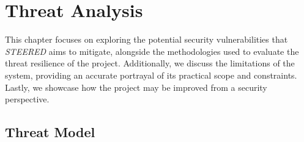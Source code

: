 \chapter{Threat Analysis}
\label{cha:ta}

This chapter focuses on exploring the potential security vulnerabilities that
\textit{STEERED} aims to mitigate, alongside the methodologies used to evaluate
the threat resilience of the project. Additionally, we discuss the limitations
of the system, providing an accurate portrayal of its practical scope and constraints.
Lastly, we showcase how the project may be improved from a security perspective.

\section{Threat Model}
\label{sec:ta_model}

